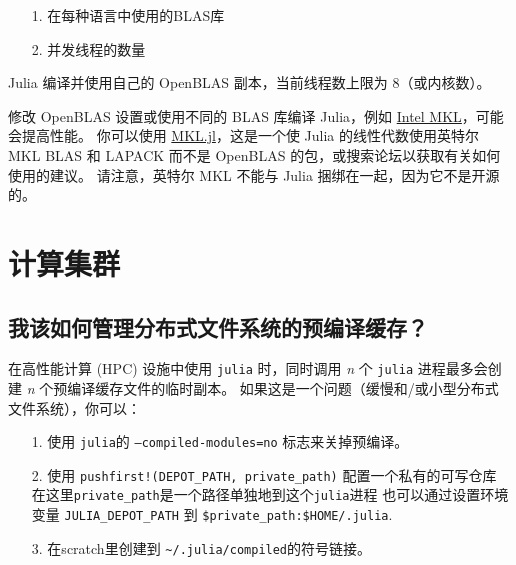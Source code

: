 \begin{itemize}
\item[1. ] 在每种语言中使用的BLAS库


\item[2. ] 并发线程的数量

\end{itemize}


Julia 编译并使用自己的 OpenBLAS 副本，当前线程数上限为 8（或内核数）。



修改 OpenBLAS 设置或使用不同的 BLAS 库编译 Julia，例如 \href{https://software.intel.com/en-us/mkl}{Intel MKL}，可能会提高性能。 你可以使用 \href{https://github.com/JuliaComputing/MKL.jl}{MKL.jl}，这是一个使 Julia 的线性代数使用英特尔 MKL BLAS 和 LAPACK 而不是 OpenBLAS 的包，或搜索论坛以获取有关如何使用的建议。 请注意，英特尔 MKL 不能与 Julia 捆绑在一起，因为它不是开源的。



\hypertarget{1807339410285786625}{}


\section{计算集群}



\hypertarget{16944626185242570374}{}


\subsection{我该如何管理分布式文件系统的预编译缓存？}



在高性能计算 (HPC) 设施中使用 \texttt{julia} 时，同时调用 \emph{n} 个 \texttt{julia} 进程最多会创建 \emph{n} 个预编译缓存文件的临时副本。 如果这是一个问题（缓慢和/或小型分布式文件系统），你可以：



\begin{itemize}
\item[1. ] 使用 \texttt{julia}的 \texttt{--compiled-modules=no} 标志来关掉预编译。


\item[2. ] 使用 \texttt{pushfirst!(DEPOT\_PATH, private\_path)} 配置一个私有的可写仓库 在这里\texttt{private\_path}是一个路径单独地到这个\texttt{julia}进程 也可以通过设置环境变量 \texttt{JULIA\_DEPOT\_PATH} 到 \texttt{\$private\_path:\$HOME/.julia}.


\item[3. ] 在scratch里创建到 \texttt{{\textasciitilde}/.julia/compiled}的符号链接。

\end{itemize}


